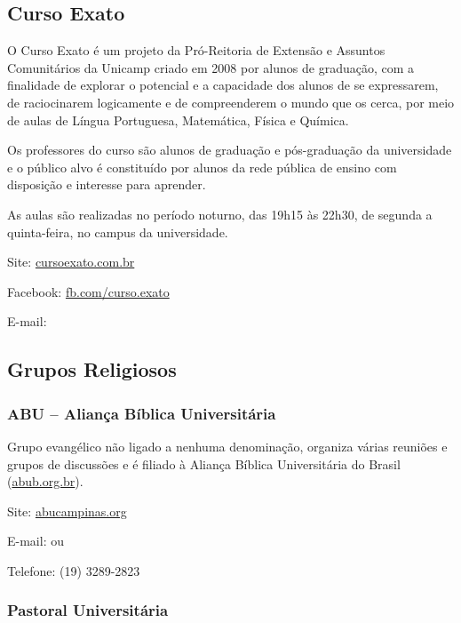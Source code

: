 \subsection{Curso Exato}

O Curso Exato é um projeto da Pró-Reitoria de Extensão e Assuntos Comunitários
da Unicamp criado em 2008 por alunos de graduação, com a finalidade de explorar
o potencial e a capacidade dos alunos de se expressarem, de raciocinarem
logicamente e de compreenderem o mundo que os cerca, por meio de aulas de Língua
Portuguesa, Matemática, Física e Química.

Os professores do curso são alunos de graduação e pós-graduação da universidade
e o público alvo é constituído por alunos da rede pública de ensino com
disposição e interesse para aprender.

As aulas são realizadas no período noturno, das 19h15 às 22h30, de segunda
a quinta-feira, no campus da universidade.

\begin{compactitemize}
\item Site: \url{cursoexato.com.br}
\item Facebook: \url{fb.com/curso.exato}
\item E-mail: 
\end{compactitemize}

\subsection{Grupos Religiosos}

\subsubsection*{ABU -- Aliança Bíblica Universitária}

Grupo evangélico não ligado a nenhuma denominação, organiza várias reuniões
e grupos de discussões e é filiado à Aliança Bíblica Universitária do Brasil
(\url{abub.org.br}).

\begin{compactitemize}
\item Site: \url{abucampinas.org}
\item E-mail:  ou
\item Telefone: (19) 3289-2823
\end{compactitemize}

\subsubsection*{Pastoral Universitária}

